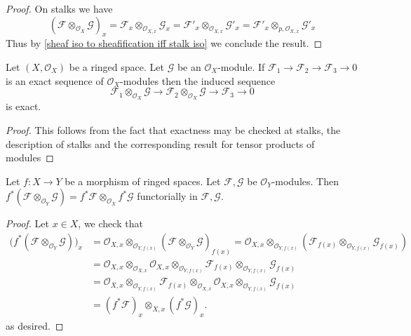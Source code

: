 \begin{proof}
On stalks we have 
\[(\mathscr{F}\otimes_{\mathscr{O}_X}\mathscr{G})_x=\mathscr{F}_x\otimes_{\mathscr{O}_{X,x}}\mathscr{G}_x=\mathscr{F}'_x\otimes_{\mathscr{O}_{X,x}}\mathscr{G}'_x=\mathscr{F}'_x\otimes_{p,\mathscr{O}_{X,x}}\mathscr{G}'_x\]
Thus by \cref{sheaf iso to sheafification iff stalk iso} we conclude the result.
\end{proof}
\begin{proposition}\label{sheaf module tensor exact}
Let $(X,\mathscr{O}_X)$ be a ringed space. Let $\mathscr{G}$ be an $\mathscr{O}_X$-module. If $\mathscr{F}_1\to\mathscr{F}_2\to\mathscr{F}_3\to 0$ is an exact sequence of $\mathscr{O}_X$-modules then the induced sequence
\[\mathscr{F}_1\otimes_{\mathscr{O}_X}\mathscr{G}\to\mathscr{F}_2\otimes_{\mathscr{O}_X}\mathscr{G}\to\mathscr{F}_3\to 0\]
is exact.
\end{proposition}
\begin{proof}
This follows from the fact that exactness may be checked at stalks, the description of stalks and the corresponding result for tensor products of modules
\end{proof}
\begin{proposition}\label{sheaf tensor pull back}
Let $f:X\to Y$ be a morphism of ringed spaces. Let $\mathscr{F},\mathscr{G}$ be $\mathscr{O}_Y$-modules. Then $f^*(\mathscr{F}\otimes_{\mathscr{O}_Y}\mathscr{G})=f^*\mathscr{F}\otimes_{\mathscr{O}_X}f^*\mathscr{G}$ functorially in $\mathscr{F},\mathscr{G}$.
\end{proposition}
\begin{proof}
Let $x\in X$, we check that
\begin{align*}
\big(f^*(\mathscr{F}\otimes_{\mathscr{O}_Y}\mathscr{G})\big)_x&=\mathscr{O}_{X,x}\otimes_{\mathscr{O}_{Y,f(x)}}(\mathscr{F}\otimes_{\mathscr{O}_Y}\mathscr{G})_{f(x)}=\mathscr{O}_{X,x}\otimes_{\mathscr{O}_{Y,f(x)}}(\mathscr{F}_{f(x)}\otimes_{\mathscr{O}_{Y,f(x)}}\mathscr{G}_{f(x)})\\
&=\mathscr{O}_{X,x}\otimes_{\mathscr{O}_{X,x}}\mathscr{O}_{X,x}\otimes_{\mathscr{O}_{Y,f(x)}}\mathscr{F}_{f(x)}\otimes_{\mathscr{O}_{Y,f(x)}}\mathscr{G}_{f(x)}\\
&=\mathscr{O}_{X,x}\otimes_{\mathscr{O}_{Y,f(x)}}\mathscr{F}_{f(x)}\otimes_{\mathscr{O}_{X,x}}\mathscr{O}_{X,x}\otimes_{\mathscr{O}_{Y,f(x)}}\mathscr{G}_{f(x)}\\
&=(f^*\mathscr{F})_x\otimes_{X,x}(f^*\mathscr{G})_x.
\end{align*}
as desired.
\end{proof}
